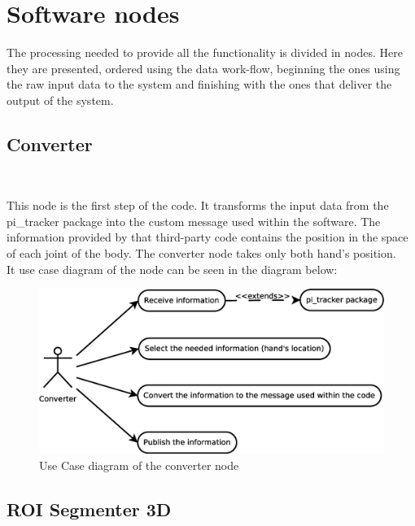 \section{Software nodes}
\label{software_nodes}


The processing needed to provide all the functionality is divided in nodes. Here they are presented, ordered using the data work-flow, beginning the ones using the raw input data to the system and finishing with the ones that deliver the output of the system. 
\\


\subsection{\large Converter}\\
		\label{converter}

	This node is the first step of the code. It transforms the input data from the pi\_tracker package into the custom message used within the software. The information provided by that third-party code contains the position in the space of each joint of the body. The converter node takes only both hand's position. 
	\\

	It use case diagram of the node can be seen in the diagram below: 

	\begin{figure}[H]
		\centering
	\includegraphics[scale=0.4]{img/diagrams/uc_converter.eps}
		\caption[Use case diagram converter node]{Use Case diagram of the converter node}
		
	\end{figure}

	
\subsection{ROI Segmenter 3D}\\
	\label{roi_segmenter_3d}

